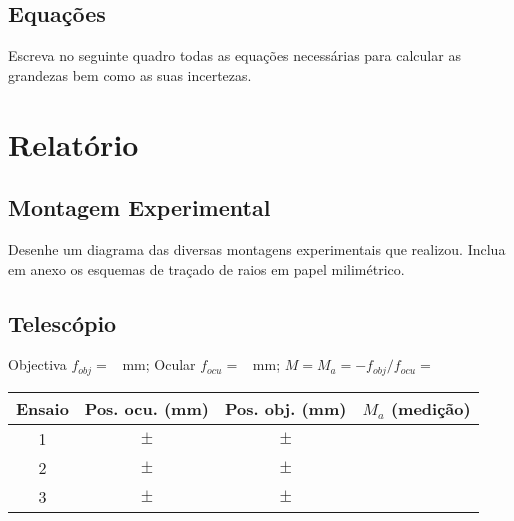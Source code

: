 \documentclass[a4paper,12pt]{article}  %
\begin{document}
\subsection{\sf Equações }
Escreva no seguinte quadro todas as equações necessárias para calcular as grandezas bem como as suas incertezas.
\begin{center}
\framebox[18cm]{\rule{0pt}{8.5cm}}
\end{center}


\section{\sf Relatório}
\subsection{\sf Montagem Experimental}
Desenhe um diagrama das diversas montagens experimentais que realizou. Inclua em anexo os esquemas de traçado de raios em papel milimétrico.

\begin{center}
\framebox[18cm]{\rule{0pt}{10cm}}
\end{center}




\subsection{\sf Telescópio}
 \vspace{1.0cm}

Objectiva $f_{obj}=$~\underline{\makebox[1cm][r]{~}} mm;
Ocular $f_{ocu}=$~\underline{\makebox[1cm][r]{~}} mm; 
$M=M_a=-f_{obj}/f_{ocu}=$~\underline{\makebox[1cm][r]{~}} 

	 


\begin{center}
	\begin{tabular}{|c|c|c|c|}
	\hline
	Ensaio &
	 Pos. ocu. (mm) &  
	 Pos. obj. (mm) &
	 $M_a$ (medição) \\
	 
	\hline \hline
	1  & $\pm$ & \quad $\pm$ \quad & \\ \cline{1-4}
	 2 & $\pm$ & \quad $\pm$ \quad & \\ \cline{1-4}
	 3 & $\pm$ & \quad $\pm$ \quad & \\ \hline
	\end{tabular}
\end{center}
\newpage
\end{document}
